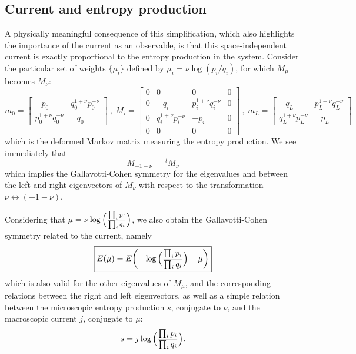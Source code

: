 \documentclass[aps,pre,onecolumn,showpacs,showkeys,a4paper]{revtex4-1}
\begin{document}
\subsection{Current and entropy production}
\label{IIc}

A physically meaningful consequence of this simplification, which also highlights the importance of the current as an observable, is that this space-independent current is exactly proportional to the entropy production in the system. Consider the particular set of weights $\{\mu_i\}$ defined by $\mu_i=\nu\log{(p_i/q_i)}$, for which $M_{\mu}$ becomes $M_\nu$:
\begin{equation}\label{MLambda}
m_0=\begin{bmatrix} -p_0 & q_0^{1+\nu}p_0^{-\nu} \\ p_0^{1+\nu}q_0^{-\nu} & -q_0  \end{bmatrix}~,~ M_{i}=\begin{bmatrix} 0 & 0 & 0 & 0 \\ 0 & -q_i & p_i^{1+\nu}q_i^{-\nu} & 0 \\ 0 & q_i^{1+\nu}p_i^{-\nu}& -p_i & 0 \\ 0 & 0 & 0 & 0 \end{bmatrix}~,~m_L=\begin{bmatrix} -q_L & p_L^{1+\nu}q_L^{-\nu} \\  q_L^{1+\nu}p_L^{-\nu} & -p_L  \end{bmatrix}
\end{equation}
which is the deformed Markov matrix measuring the entropy production. We see immediately that
\begin{equation}
M_{-1-\nu}= ~^t\!M_\nu
\end{equation}
which implies the Gallavotti-Cohen symmetry \cite{PhysRevLett.74.2694,Lebowitz99agallavotti-cohen} for the eigenvalues and between the left and right eigenvectors of $M_\nu$ with respect to the transformation $\nu\leftrightarrow(-1\!-\!\nu)$.

Considering that $\mu=\nu \log{\Bigl(\frac{\prod_i p_i}{\prod_i q_i}\Bigr)}$, we also obtain the Gallavotti-Cohen symmetry related to the current, namely
\begin{equation}\boxed{
E(\mu)=E\biggl(-\log{\Bigl(\frac{\prod_i p_i}{\prod_i q_i}\Bigr)}-\mu\biggr)
}
\end{equation}
which is also valid for the other eigenvalues of $M_\mu$, and the corresponding relations between the right and left eigenvectors, as well as a simple relation between the microscopic entropy production $s$, conjugate to $\nu$, and the macroscopic current $j$, conjugate to $\mu$:
\begin{equation}\label{sj}
s= j\log{\Bigl(\frac{\prod_i p_i}{\prod_i q_i}\Bigr)}.
\end{equation}
\end{document}
